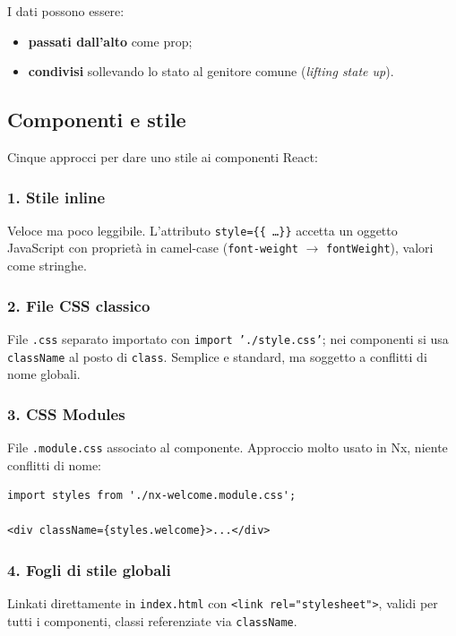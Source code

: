 \documentclass[11pt,a4paper]{article}
\begin{document}
I dati possono essere:
\begin{itemize}[leftmargin=*]
    \item \textbf{passati dall'alto} come prop;
    \item \textbf{condivisi} sollevando lo stato al genitore comune (\emph{lifting state up}).
\end{itemize}

\subsection{Componenti e stile}

Cinque approcci per dare uno stile ai componenti React:

\subsubsection{1. Stile inline}
Veloce ma poco leggibile. L'attributo \texttt{style=\{\{ \ldots \}\}} accetta un oggetto JavaScript con propriet\`a in camel-case (\texttt{font-weight} $\to$ \texttt{fontWeight}), valori come stringhe.

\subsubsection{2. File CSS classico}
File \texttt{.css} separato importato con \texttt{import './style.css'}; nei componenti si usa \texttt{className} al posto di \texttt{class}. Semplice e standard, ma soggetto a conflitti di nome globali.

\subsubsection{3. CSS Modules}
File \texttt{.module.css} associato al componente. Approccio molto usato in Nx, niente conflitti di nome:

\begin{lstlisting}[language=tsx]
import styles from './nx-welcome.module.css';

<div className={styles.welcome}>...</div>
\end{lstlisting}

\subsubsection{4. Fogli di stile globali}
Linkati direttamente in \texttt{index.html} con \texttt{<link rel="stylesheet">}, validi per tutti i componenti, classi referenziate via \texttt{className}.
\end{document}
